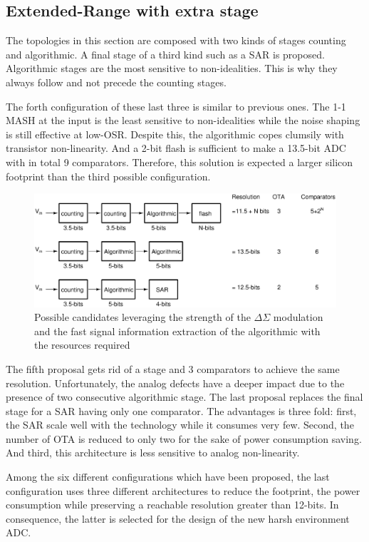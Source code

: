 \subsection{Extended-Range with extra stage}
The topologies in this section are composed with two kinds of stages counting and algorithmic. A final stage of a third kind such as a SAR is proposed. Algorithmic stages are the most sensitive to non-idealities. This is why they always follow and not precede the counting stages.

The forth configuration of these last three is similar to previous ones. The 1-1 MASH at the input is the least sensitive to non-idealities while the noise shaping is still effective at low-OSR\@. Despite this, the algorithmic copes clumsily with transistor non-linearity. And a 2-bit flash is sufficient to make a 13.5-bit ADC with in total 9 comparators. Therefore, this solution is expected a larger silicon footprint than the third possible configuration.

\begin{figure}[htp]
	\centering
	\includegraphics[width=.9\textwidth]{Chapter4/Figs/study/counting-algo-conversion.ps}
	\caption{Possible candidates leveraging the strength of the \(\Delta \Sigma\) modulation and the fast signal information extraction of the algorithmic with the resources required }
	\label{fig:counting-algo-candidates}
\end{figure}

The fifth proposal gets rid of a stage and 3 comparators to achieve the same resolution. Unfortunately, the analog defects have a deeper impact due to the presence of two consecutive algorithmic stage. The last proposal replaces the final stage for a SAR having only one comparator. The advantages is three fold: first, the SAR scale well with the technology while it consumes very few. Second, the number of OTA is reduced to only two for the sake of power consumption saving. And third, this architecture is less sensitive to analog non-linearity.

Among the six different configurations which have been proposed, the last configuration uses three different architectures to reduce the footprint, the power consumption while preserving a reachable resolution greater than 12-bits. In consequence, the latter is selected for the design of the new harsh environment ADC\@.

